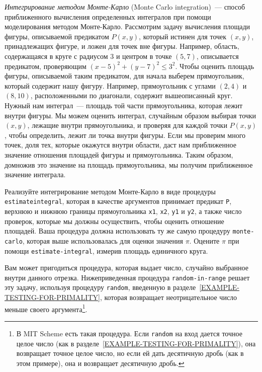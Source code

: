 \begin{exercise}{3.5}\label{EX3.5}%
%
%
%
{\em Интегрирование методом
Монте-Карло} (Monte Carlo integration)~--- способ приближенного
вычисления определенных интегралов при помощи
моделирования методом Монте-Карло.  Рассмотрим
задачу вычисления площади фигуры, описываемой предикатом
$P(x,y)$, который истинен для точек
$(x,y)$, принадлежащих фигуре, и ложен для
точек вне фигуры.  Например, область, содержащаяся в круге с радиусом
3 и центром в точке $(5,7)$, описывается предикатом, проверяющим
$(x-5)^2 + (y-7)^2 \le 3^2$.  Чтобы оценить
площадь фигуры, описываемой таким предикатом, для начала выберем
прямоугольник, который содержит нашу фигуру.  Например, прямоугольник
с углами $(2,4)$ и $(8,10)$, расположенными по диагонали, содержит
вышеописанный круг.  Нужный нам интеграл~--- площадь той части
прямоугольника, которая лежит внутри фигуры.  Мы можем оценить
интеграл, случайным образом выбирая точки
$(x,y)$, лежащие внутри прямоугольника, и
проверяя для каждой точки $P(x,y)$, чтобы
определить, лежит ли точка внутри фигуры.  Если мы проверим много
точек, доля тех, которые окажутся внутри области, даст нам
приближенное значение отношения площадей фигуры и прямоугольника.
Таким образом, домножив это значение на площадь прямоугольника, мы
получим приближенное значение интеграла.

Реализуйте интегрирование методом Монте-Карло в виде
процедуры {\tt estimate\-integral},
которая в качестве
аргументов принимает предикат {\tt P}, верхнюю и нижнюю границы
прямоугольника {\tt x1}, {\tt x2}, {\tt y1}
и {\tt y2}, а также число
проверок, которые мы должны осуществить, чтобы оценить отношение
площадей.  Ваша процедура должна использовать ту же самую процедуру
{\tt monte-carlo}, которая выше использовалась для оценки
значения $\pi$.  Оцените $\pi$ при помощи
{\tt estimate-integral}, измерив площадь единичного круга.

Вам может пригодиться процедура, которая выдает
число, случайно выбранное внутри данного отрезка.  Нижеприведенная
процедура {\tt random-in-range} решает эту задачу, используя
процедуру {\tt random}, введенную в
разделе~\ref{EXAMPLE-TESTING-FOR-PRIMALITY}, которая возвращает
неотрицательное число меньше своего аргумента\footnote{В MIT Scheme есть такая процедура.
  Если {\tt random} на вход дается точное целое число (как в
  разделе~\ref{EXAMPLE-TESTING-FOR-PRIMALITY}), она возвращает
  точное целое число, но если ей дать десятичную дробь (как в этом
  примере), она и возвращает десятичную дробь.}.


\end{exercise}
